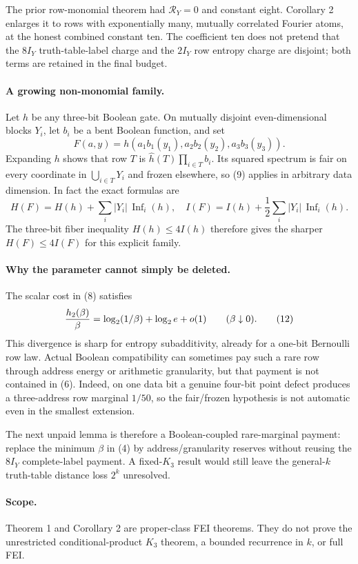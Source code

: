 The prior row-monomial theorem had $\mathcal R_Y=0$ and constant eight.
Corollary 2 enlarges it to rows with exponentially many, mutually correlated
Fourier atoms, at the honest combined constant ten.  The coefficient ten
does not pretend that the $8I_Y$ truth-table-label charge and the $2I_Y$ row
entropy charge are disjoint; both terms are retained in the final budget.

\paragraph{A growing non-monomial family.}
Let $h$ be any three-bit Boolean gate.  On mutually disjoint even-dimensional
blocks $Y_i$, let $b_i$ be a bent Boolean function, and set
\[
 F(a,y)=h(a_1b_1(y_1),a_2b_2(y_2),a_3b_3(y_3)).         \tag{10}
\]
Expanding $h$ shows that row $T$ is
$\widehat h(T)\prod_{i\in T}b_i$.  Its squared spectrum is fair on every
coordinate in $\bigcup_{i\in T}Y_i$ and frozen elsewhere, so (9) applies in
arbitrary data dimension.  In fact the exact formulas are
\[
 H(F)=H(h)+\sum_i |Y_i|\,\operatorname{Inf}_i(h),
 \quad
 I(F)=I(h)+\frac12\sum_i |Y_i|\,\operatorname{Inf}_i(h). \tag{11}
\]
The three-bit fiber inequality $H(h)\le4I(h)$ therefore gives the sharper
$H(F)\le4I(F)$ for this explicit family.

\paragraph{Why the parameter cannot simply be deleted.}
The scalar cost in (8) satisfies
\[
 {h_2(\beta)\over\beta}=\log_2(1/\beta)+\log_2 e+o(1)
 \qquad(\beta\downarrow0).                              \tag{12}
\]
This divergence is sharp for entropy subadditivity, already for a one-bit
Bernoulli row law.  Actual Boolean compatibility can sometimes pay such a
rare row through address energy or arithmetic granularity, but that payment
is not contained in (6).  Indeed, on one data bit a genuine four-bit point
defect produces a three-address row marginal $1/50$, so the fair/frozen
hypothesis is not automatic even in the smallest extension.

The next unpaid lemma is therefore a Boolean-coupled rare-marginal payment:
replace the minimum $\beta$ in (4) by address/granularity reserves without
reusing the $8I_Y$ complete-label payment.  A fixed-$K_3$ result would still
leave the general-$k$ truth-table distance loss $2^k$ unresolved.

\paragraph{Scope.}
Theorem 1 and Corollary 2 are proper-class FEI theorems.  They do not prove
the unrestricted conditional-product $K_3$ theorem, a bounded recurrence in
$k$, or full FEI.
